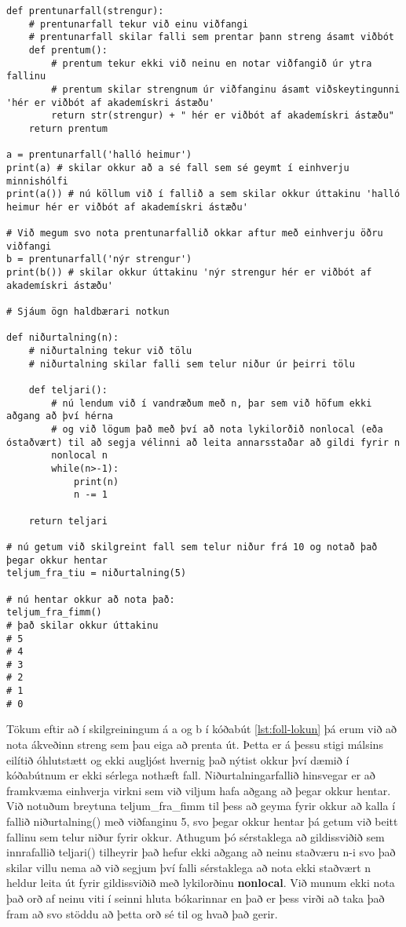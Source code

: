 \begin{lstlisting}[caption=Lokun kynnt, label=lst:foll-lokun]
def prentunarfall(strengur):
	# prentunarfall tekur við einu viðfangi
	# prentunarfall skilar falli sem prentar þann streng ásamt viðbót
	def prentum():
		# prentum tekur ekki við neinu en notar viðfangið úr ytra fallinu
		# prentum skilar strengnum úr viðfanginu ásamt viðskeytingunni 'hér er viðbót af akademískri ástæðu'
		return str(strengur) + " hér er viðbót af akademískri ástæðu"
	return prentum

a = prentunarfall('halló heimur')
print(a) # skilar okkur að a sé fall sem sé geymt í einhverju minnishólfi
print(a()) # nú köllum við í fallið a sem skilar okkur úttakinu 'halló heimur hér er viðbót af akademískri ástæðu'

# Við megum svo nota prentunarfallið okkar aftur með einhverju öðru viðfangi
b = prentunarfall('nýr strengur')
print(b()) # skilar okkur úttakinu 'nýr strengur hér er viðbót af akademískri ástæðu'

# Sjáum ögn haldbærari notkun

def niðurtalning(n):
	# niðurtalning tekur við tölu
	# niðurtalning skilar falli sem telur niður úr þeirri tölu
	
	def teljari():
		# nú lendum við í vandræðum með n, þar sem við höfum ekki aðgang að því hérna 
		# og við lögum það með því að nota lykilorðið nonlocal (eða óstaðvært) til að segja vélinni að leita annarsstaðar að gildi fyrir n
		nonlocal n
		while(n>-1):
			print(n)
			n -= 1
	
	return teljari
	
# nú getum við skilgreint fall sem telur niður frá 10 og notað það þegar okkur hentar
teljum_fra_tiu = niðurtalning(5)

# nú hentar okkur að nota það:
teljum_fra_fimm()
# það skilar okkur úttakinu
# 5
# 4
# 3
# 2
# 1
# 0
\end{lstlisting}

Tökum eftir að í skilgreiningum á a og b í kóðabút \ref{lst:foll-lokun} þá erum við að nota ákveðinn streng sem þau eiga að prenta út.
Þetta er á þessu stigi málsins eilítið óhlutstætt og ekki augljóst hvernig það nýtist okkur því dæmið í kóðabútnum er ekki sérlega nothæft fall.
Niðurtalningarfallið hinsvegar er að framkvæma einhverja virkni sem við viljum hafa aðgang að þegar okkur hentar.
Við notuðum breytuna teljum\_fra\_fimm til þess að geyma fyrir okkur að kalla í fallið niðurtalning() með viðfanginu 5, svo þegar okkur hentar þá getum við beitt fallinu sem telur niður fyrir okkur.
Athugum þó sérstaklega að gildissviðið sem innrafallið teljari() tilheyrir það hefur ekki aðgang að neinu staðværu n-i svo það skilar villu nema að við segjum því falli sérstaklega að nota ekki staðvært n heldur leita út fyrir gildissviðið með lykilorðinu \textbf{nonlocal}.
Við munum ekki nota það orð af neinu viti í seinni hluta bókarinnar en það er þess virði að taka það fram að svo stöddu að þetta orð sé til og hvað það gerir.